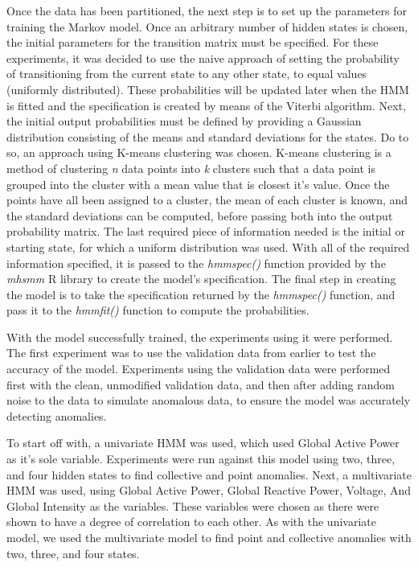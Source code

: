 \documentclass[letterpaper, 11pt]{article}%
\begin{document}
Once the data has been partitioned, the next step is to set up the parameters for training the Markov model. Once an arbitrary number of hidden states is chosen, the initial parameters for the transition matrix must be specified. For these experiments, it was decided to use the naive approach of setting the probability of transitioning from the current state to any other state, to equal values (uniformly distributed). These probabilities will be updated later when the HMM is fitted and the specification is created by means of the Viterbi algorithm. Next, the initial output probabilities must be defined by providing a Gaussian distribution consisting of the means and standard deviations for the states. Do to so, an approach using K-means clustering was chosen. K-means clustering is a method of clustering \textit{n} data points into \textit{k} clusters such that a data point is grouped into the cluster with a mean value that is closest it's value. Once the points have all been assigned to a cluster, the mean of each cluster is known, and the standard deviations can be computed, before passing both into the output probability matrix. The last required piece of information needed is the initial or starting state, for which a uniform distribution was used. With all of the required information specified, it is passed to the \textit{hmmspec()} function provided by the \textit{mhsmm} R library to create the model's specification. The final step in creating the model is to take the specification returned by the \textit{hmmspec()} function, and pass it to the \textit{hmmfit()} function to compute the probabilities.

With the model successfully trained, the experiments using it were performed. The first experiment was to use the validation data from earlier to test the accuracy of the model. Experiments using the validation data were performed first with the clean, unmodified validation data, and then after adding random noise to the data to simulate anomalous data, to ensure the model was accurately detecting anomalies.

To start off with, a univariate HMM was used, which used Global Active Power as it's sole variable. Experiments were run against this model using two, three, and four hidden states to find collective and point anomalies. Next, a multivariate HMM was used, using Global Active Power, Global Reactive Power, Voltage, And Global Intensity as the variables. These variables were chosen as there were shown to have a degree of correlation to each other. As with the univariate model, we used the multivariate model to find point and collective anomalies with two, three, and four states.
\end{document}
